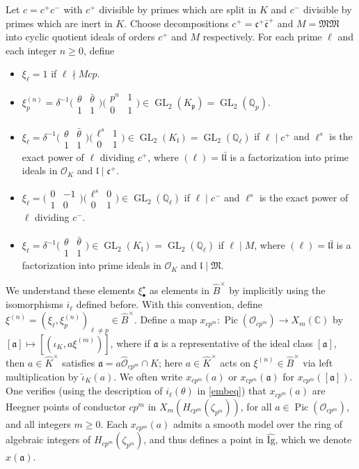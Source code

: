 \documentclass[a4paper,11pt]{amsart}
\numberwithin{equation}{section}
\theoremstyle{plain}
\theoremstyle{definition}
\theoremstyle{remark}
\newcommand{\Q}{\mathbb{Q}}
\newcommand{\C}{\mathbb{C}}
\DeclareMathOperator{\Pic}{Pic}
\DeclareMathOperator{\GL}{GL}
\newcommand{\smallmat}[4]{\bigl(\begin{smallmatrix}#1&#2\\#3&#4\end{smallmatrix}\bigr)}
\begin{document}
{Let $c=c^+c^-$ with $c^+$ divisible by primes which are split in $K$ and $c^-$ divisible by primes which are inert in $K$. Choose decompositions $c^+=\mathfrak{c}^+\bar{\mathfrak{c}}^+$ and 
$M=\mathfrak{M}\overline{\mathfrak{M}}$ into cyclic quotient ideals of orders $c^+$ and $M$ respectively. 
For each prime $\ell$ and each integer $n\geq 0$, define 
\begin{itemize}
      \item $\xi_\ell=1$ if $\ell\nmid Mcp$.
           \item $\xi_{p}^{(n)}=\delta^{-1}\smallmat{\theta}{\bar\theta}{1}{1}\smallmat{p^n}{1}{0}{1}
           \in \GL_2(K_\mathfrak{p})=\GL_2(\Q_p)$. 
        \item $\xi_{\ell}=\delta^{-1}\smallmat{\theta}{\bar\theta}{1}{1}\smallmat{\ell^s}{1}{0}{1}\in \GL_2(K_\mathfrak{l})=\GL_2(\Q_\ell)$ if $\ell\mid c^+$ and $\ell^s$ is the exact power of $\ell$ dividing $c^+$, 
        where $(\ell)=\mathfrak{l}\bar{\mathfrak{l}}$ is a factorization into prime ideals in $\mathcal{O}_K$ and $\mathfrak{l}\mid \mathfrak{c}^+$. 
       \item $\xi_{\ell}=\smallmat{0}{-1}{1}{0}\smallmat{\ell^s}{0}{0}{1}\in \GL_2(\Q_\ell)$ if $\ell\mid c^-$ and $\ell^s$ is the exact power of $\ell$ dividing $c^-$.
         \item $\xi_\ell=\delta^{-1}\smallmat{\theta}{\bar\theta}{1}{1}\in \GL_2(K_\mathfrak{l})=\GL_2(\Q_\ell)$ if $\ell\mid M$, where $(\ell)=\mathfrak{l}\bar{\mathfrak{l}}$ is a factorization into prime ideals in $\mathcal{O}_K$ and $\mathfrak{l}\mid \mathfrak{M}$.
  \end{itemize}
We understand these elements $\xi^\star_\bullet$ as elements in $\widehat{B}^\times$ by implicitly using the isomorphisms $i_\ell$ defined before. 
With this convention, define $\xi^{(n)}=(\xi_\ell,\xi_{p}^{(n)})_{\ell\neq p}\in \widehat{B}^\times$.  
Define a map $x_{cp^m}\colon\Pic(\mathcal{O}_{cp^m})\rightarrow {X}_m(\C)$ by $[\mathfrak{a}]\mapsto[(\iota_K,a\xi^{(m)})]$, where
if $\mathfrak{a}$ is a representative of the ideal class $[\mathfrak{a}]$, then $a\in \widehat{K}^\times$ satisfies $\mathfrak{a}=a\widehat{\mathcal{O}}_{cp^m}\cap K$; here $a \in \widehat{K}^\times$ acts on $\xi^{(n)}\in \widehat{B}^\times$ via left multiplication by $\hat{\iota}_K(a)$. We often write $x_{cp^m}(a)$ or $x_{cp^m}(\mathfrak{a})$ 
for $x_{cp^m}([\mathfrak{a}])$.
One verifies (using the description of $i_\ell(\theta)$ in \eqref{embeq}) that $x_{cp^m}(a)$ are Heegner points of conductor $cp^m$ in $X_m(H_{cp^m}(\zeta_{p^m}))$, for all 
$a\in\Pic(\mathcal{O}_{cp^m})$, and all integers $m\geq0$. 
Each $x_{cp^m}(a)$ admits a smooth model over the ring of 
algebraic integers of $H_{cp^m}(\zeta_{p^m})$, and thus defines 
a point in $\widehat{\mathrm{Ig}}$, which we denote
$x(\mathfrak{a})$. 

}
\end{document}
